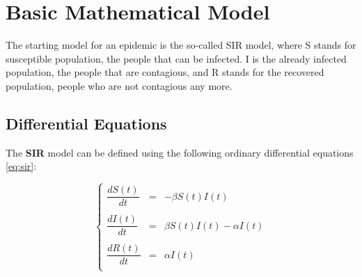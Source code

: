 \documentclass[11pt, a4paper, twoside]{report}
\begin{document}
\section{Basic Mathematical Model}
\label{section:mathmodel}

The starting model for an epidemic is the so-called SIR model, where S stands for susceptible population, the people that can be infected. I is the already infected population, the people that are contagious, and R stands for the recovered population, people who are not contagious any more. 

\subsection{Differential Equations}

The \textbf{SIR} model can be defined using the following ordinary differential equations \ref{eq:sir}:


\begin{equation}
\left\{   %
\begin{array}{rcl} 
\dfrac{dS(t)}{dt} & = & -\beta S(t)I(t)\\
\\
\dfrac{dI(t)}{dt} & = & \beta S(t)I(t) - \alpha I(t) \\
\\
\dfrac{dR(t)}{dt} & = & \alpha I(t) \\
\end{array}
\right. 
\label{eq:sir}
\end{equation}
\end{document}
